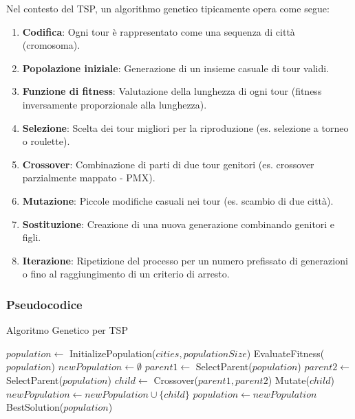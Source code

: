 Nel contesto del \gls{TSP}, un algorithmo genetico tipicamente opera come segue:

\begin{enumerate}
	\item \textbf{Codifica}: Ogni tour è rappresentato come una sequenza di città (cromosoma).
	\item \textbf{Popolazione iniziale}: Generazione di un insieme casuale di tour validi.
	\item \textbf{Funzione di fitness}: Valutazione della lunghezza di ogni tour (fitness inversamente proporzionale alla lunghezza).
	\item \textbf{Selezione}: Scelta dei tour migliori per la riproduzione (es. selezione a torneo o roulette).
	\item \textbf{Crossover}: Combinazione di parti di due tour genitori (es. crossover parzialmente mappato - PMX).
	\item \textbf{Mutazione}: Piccole modifiche casuali nei tour (es. scambio di due città).
	\item \textbf{Sostituzione}: Creazione di una nuova generazione combinando genitori e figli.
	\item \textbf{Iterazione}: Ripetizione del processo per un numero prefissato di generazioni o fino al raggiungimento di un criterio di arresto.
\end{enumerate}

\subsubsection{Pseudocodice}


\begin{algorithm}
	\caption{Algoritmo Genetico per \gls{TSP}}\label{alg:geneticalgorithm}
	\begin{algorithmic}[1]
		\State $population \gets$ InitializePopulation($cities, populationSize$)
		\State EvaluateFitness($population$)
		\State $newPopulation \gets \emptyset$
		\State $parent1 \gets$ SelectParent($population$)
		\State $parent2 \gets$ SelectParent($population$)
		\State $child \gets$ Crossover($parent1, parent2$)
		\State Mutate($child$)
		\EndIf
		\State $newPopulation \gets newPopulation \cup \{child\}$
		\EndWhile
		\State $population \gets newPopulation$
		\EndFor
		\State \Return BestSolution($population$)
		\EndProcedure
	\end{algorithmic}
\end{algorithm}

